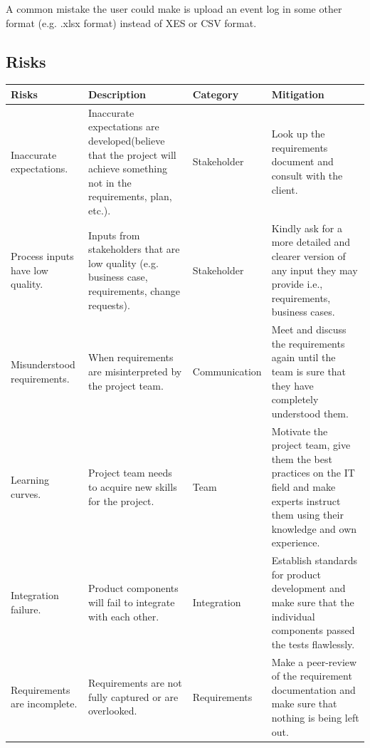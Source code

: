 \documentclass[notitlepage]{article}
\begin{document}
\begin{flushleft}
A common mistake the user could make is upload an event log in some other format (e.g. .xlsx format) instead of XES or CSV format.




\subsection{Risks}
\begin{tabularx}{\textwidth}{|X|X|p{3cm}|X|}
\hline
\textbf{Risks} 
&\textbf{Description}
&\textbf{Category}
&\textbf{Mitigation}\\
\hline
Inaccurate expectations. &Inaccurate expectations are developed(believe that the project will achieve something not in the requirements, plan, etc.).&Stakeholder &Look up the requirements document and consult with the client.\\
\hline
Process inputs have low quality. &Inputs from stakeholders that are low quality (e.g. business case, requirements, change requests). &Stakeholder	&Kindly ask for a more detailed and clearer version of any input they may provide i.e., requirements, business cases.\\
\hline
Misunderstood requirements.	&When requirements are misinterpreted by the project team.	&Communication &Meet and discuss the requirements again until the team is sure that they have completely understood them.\\ 
\hline
Learning curves. &Project team needs to acquire new skills for the project.	&Team	&Motivate the project team, give them the best practices on the IT field and make experts instruct them using their knowledge and own experience.\\ 
\hline
Integration failure. &Product components will fail to integrate with each other. &Integration	&Establish standards for product development and make sure that the individual components passed the tests flawlessly.\\ 
\hline
Requirements are incomplete. &Requirements are not fully captured or are overlooked.	&Requirements	&Make a peer-review of the requirement documentation and make sure that nothing is being left out.\\ 
\hline
\end{tabularx}




\end{flushleft}
\end{document}
